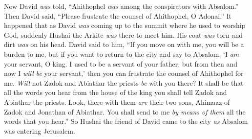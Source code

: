 \begin{biblechapter}
\verse Now David \textit{was} told, “Ahithophel \textit{was} among the conspirators with Absalom.” Then David said, “Please frustrate the counsel of Ahithophel, O Adonai.”
\verse It happened that as David \textit{was} coming up to the summit where he used to worship God, suddenly Hushai the Arkite \textit{was} there to meet him. His coat \textit{was} torn and dirt \textit{was} on his head.
\verse David said to him, “If you move on with me, you will be a burden to me,
\verse but if you want to return to the city and say to Absalom, ‘I \textit{am} your servant, O king. I used to be a servant of your father, but from then and now I \textit{will be} your servant,’ then you can frustrate the counsel of Ahithophel for me.
\verse \textit{Will} not Zadok and Abiathar the priests \textit{be} with you there? It shall be that all the words you hear from the house of the king you shall tell Zadok and Abiathar the priests.
\verse Look, there with them \textit{are} their two sons, Ahimaaz of Zadok and Jonathan of Abiathar. You shall send to me \textit{by means of them} all the words that you hear.”
\verse So Hushai the friend of David came to the city \textit{as} Absalom was entering Jerusalem.
\end{biblechapter}

